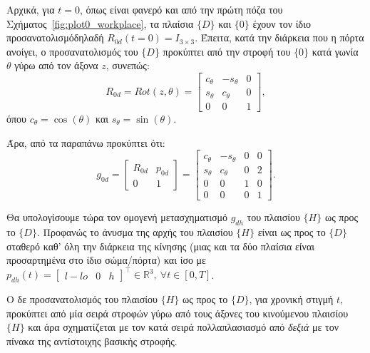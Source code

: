 \documentclass[12pt]{article} %
\numberwithin{equation}{section}  %
\begin{document}
Αρχικά, για $t = 0$, όπως είναι φανερό και από την πρώτη πόζα του Σχήματος~\ref{fig:plot0_workplace}, 
τα πλαίσια $\{D\}$ και $\{0\}$ έχουν τον ίδιο προσανατολισμό\textemdash δηλαδή $R_{0d}(t = 0) = I_{3 \times 3}$. 
Έπειτα, κατά την διάρκεια που η πόρτα ανοίγει, ο προσανατολισμός του $\{D\}$ προκύπτει από την στροφή του $\{0\}$ κατά γωνία $\theta$ γύρω από τον άξονα $z$, συνεπώς:
\begin{equation*}
    R_{0d} = Rot(z, \theta) = 
    \begin{bmatrix}
        c_\theta & -s_\theta & 0 \\
        s_\theta & c_\theta & 0 \\
        0 &         0      &  1
    \end{bmatrix},
\end{equation*}
όπου $c_\theta = \cos(\theta)$ και $s_\theta = \sin(\theta)$.

Άρα, από τα παραπάνω προκύπτει ότι:
\begin{equation} \label{eq:g_0d}
    g_{0d} = \begin{bmatrix} R_{0d} & p_{0d}  \\ 0 & 1\end{bmatrix} = 
    \begin{bmatrix} 
        c_\theta  &  -s_\theta  &  0  &  0  \\
        s_\theta  &  c_\theta   &  0  &  2  \\
        0         &  0          &  1  &  0  \\
        0         &  0          &  0  &  1  
    \end{bmatrix}.
\end{equation}

Θα υπολογίσουμε τώρα τον ομογενή μετασχηματισμό $g_{dh}$ του πλαισίου $\{H\}$ ως προς το $\{D\}$. 
Προφανώς το άνυσμα της αρχής του πλαισίου $\{H\}$ είναι ως προς το $\{D\}$ σταθερό καθ' όλη την διάρκεια της κίνησης 
(μιας και τα δύο πλαίσια  είναι προσαρτημένα στο ίδιο σώμα/πόρτα)
και ίσο με $p_{dh}(t) = \begin{bmatrix} l - lo & 0 & h \end{bmatrix}^{\top} \in \mathbb{R}^3, \ \forall t \in [0, T]$.

Ο δε προσανατολισμός του πλαισίου $\{H\}$ ως προς το $\{D\}$, για χρονική στιγμή $t$, 
προκύπτει από μία σειρά στροφών γύρω από τους άξονες του κινούμενου πλαισίου $\{H\}$ και άρα 
σχηματίζεται με τον κατά σειρά πολλαπλασιασμό από \textit{δεξιά} με τον πίνακα της αντίστοιχης βασικής στροφής. 
\end{document}

